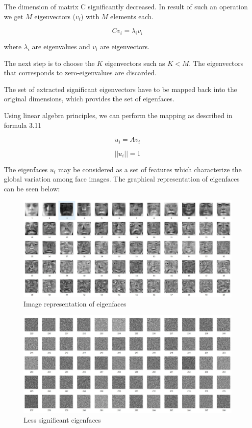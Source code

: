 The dimension of matrix C significantly decreased. In result of such an operation we get $M$ eigenvectors ($v_{i}$) with $M$ elements each. 

\begin{equation}
Cv_{i} = \lambda_{i}v_{i}
\end{equation}

where $\lambda_{i}$ are eigenvalues and $v_{i}$ are eigenvectors. 

The next step is to choose the $K$ eigenvectors such as $K < M$. The eigenvectors that corresponds to zero-eigenvalues are discarded. 

The set of extracted significant eigenvectors have to be mapped back into the original dimensions, which provides the set of eigenfaces. 

Using linear algebra principles, we can perform the mapping as described in formula 3.11

\begin{equation}
u_{i} = Av_{i}
\end{equation}

\begin{equation}
||u_{i}|| = 1
\end{equation}

The eigenfaces $u_{i}$ may be considered as a set of features which characterize the global variation among face images. The graphical representation of eigenfaces can be seen below: 


\begin{figure}[H]
\centering
\includegraphics[scale=0.45]{eigenfaces.jpg}
\caption{Image representation of eigenfaces}
\end{figure}


\begin{figure}[H]
\centering
\includegraphics[scale=0.45]{eigenfaces_worse.jpg}
\caption{Less significant eigenfaces }
\end{figure}

